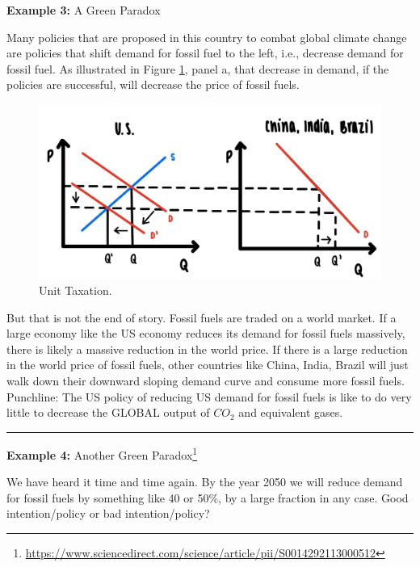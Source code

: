 \documentclass[
]{book}
\begin{document}
\textbf{Example 3:} A Green Paradox

Many policies that are proposed in this country to combat global climate change are policies that shift demand for fossil fuel to the left, i.e., decrease demand for fossil fuel. As illustrated in Figure \ref{fig:compmarkets07}, panel a, that decrease in demand, if the policies are successful, will decrease the price of fossil fuels.

\begin{figure}

{\centering \includegraphics[width=0.9\linewidth]{img/compmarkets/fig7} 

}

\caption{Unit Taxation.}\label{fig:compmarkets07}
\end{figure}

But that is not the end of story. Fossil fuels are traded on a world market. If a large economy like the US economy reduces its demand for fossil fuels massively, there is likely a massive reduction in the world price. If there is a large reduction in the world price of fossil fuels, other countries like China, India, Brazil will just walk down their downward sloping demand curve and consume more fossil fuels.
Punchline: The US policy of reducing US demand for fossil fuels is like to do very little to decrease the GLOBAL output of \(CO_2\) and equivalent gases.

\begin{center}\rule{0.5\linewidth}{0.5pt}\end{center}

\textbf{Example 4:} Another Green Paradox\footnote{\url{https://www.sciencedirect.com/science/article/pii/S0014292113000512}}

We have heard it time and time again. By the year 2050 we will reduce demand for fossil fuels by something like 40 or 50\%, by a large fraction in any case.
Good intention/policy or bad intention/policy?
\end{document}
